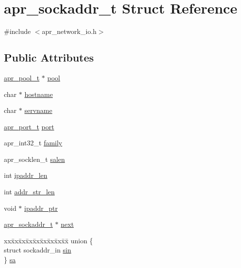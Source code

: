 \hypertarget{structapr__sockaddr__t}{}\section{apr\+\_\+sockaddr\+\_\+t Struct Reference}
\label{structapr__sockaddr__t}


{\ttfamily \#include $<$apr\+\_\+network\+\_\+io.\+h$>$}

\subsection*{Public Attributes}
\begin{DoxyCompactItemize}
\item 
\mbox{\hyperlink{group__apr__pools_gaf137f28edcf9a086cd6bc36c20d7cdfb}{apr\+\_\+pool\+\_\+t}} $\ast$ \mbox{\hyperlink{structapr__sockaddr__t_a5f2d72a6a181cf2f54ba7c922aa0dfab}{pool}}
\item 
char $\ast$ \mbox{\hyperlink{structapr__sockaddr__t_a8e675775b407f25674aaa938a40de9cd}{hostname}}
\item 
char $\ast$ \mbox{\hyperlink{structapr__sockaddr__t_a668335161a8347b9a34c600bff80b52f}{servname}}
\item 
\mbox{\hyperlink{group__apr__network__io_gaa670a71960f6eb4fe0d0de2a1e7aba03}{apr\+\_\+port\+\_\+t}} \mbox{\hyperlink{structapr__sockaddr__t_a174c19138de9c208f13ed71b5892e505}{port}}
\item 
apr\+\_\+int32\+\_\+t \mbox{\hyperlink{structapr__sockaddr__t_ac17f6e803928cfc29069a6e62dcb3a52}{family}}
\item 
apr\+\_\+socklen\+\_\+t \mbox{\hyperlink{structapr__sockaddr__t_aef1d2a482f85eeab7b6bf0a7732a087a}{salen}}
\item 
int \mbox{\hyperlink{structapr__sockaddr__t_a81be21b2eb968b83ca36183213c99867}{ipaddr\+\_\+len}}
\item 
int \mbox{\hyperlink{structapr__sockaddr__t_a8f7cda5562e904a1398ed5a4a6f0a9d9}{addr\+\_\+str\+\_\+len}}
\item 
void $\ast$ \mbox{\hyperlink{structapr__sockaddr__t_a6e1b71121ada4047acde36c6777b5442}{ipaddr\+\_\+ptr}}
\item 
\mbox{\hyperlink{structapr__sockaddr__t}{apr\+\_\+sockaddr\+\_\+t}} $\ast$ \mbox{\hyperlink{structapr__sockaddr__t_a774835c6b8e3adf255b752e8b126c434}{next}}
\item 
\begin{tabbing}
xx\=xx\=xx\=xx\=xx\=xx\=xx\=xx\=xx\=\kill
union \{\\
\>struct sockaddr\_in \mbox{\hyperlink{structapr__sockaddr__t_a7d5cf0290260c3c448360fc819b28714}{sin}}\\
\} \mbox{\hyperlink{structapr__sockaddr__t_a047d4197af76b97571c042bb5c822b78}{sa}}\\

\end{tabbing}\end{DoxyCompactItemize}


